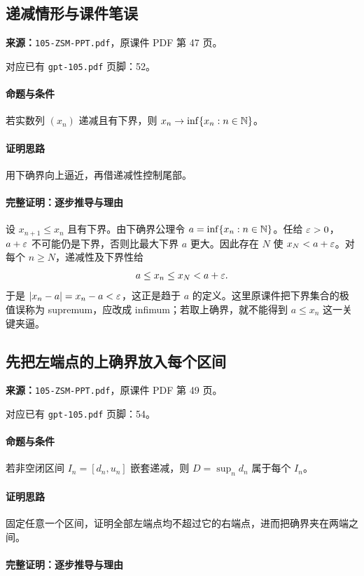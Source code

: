 \clearpage\subsection{递减情形与课件笔误}
\textbf{来源：}\texttt{105-ZSM-PPT.pdf}，原课件 PDF 第 47 页。\par
对应已有 \texttt{gpt-105.pdf} 页脚：52。\par
\paragraph{命题与条件}若实数列 $(x_n)$ 递减且有下界，则 $x_n\to\inf\{x_n:n\in\mathbb{N}\}$。
\paragraph{证明思路}用下确界向上逼近，再借递减性控制尾部。
\paragraph{完整证明：逐步推导与理由}

设 $x_{n+1}\le x_n$ 且有下界。由下确界公理令 $a=\inf\{x_n:n\in\mathbb{N}\}$。任给 $\varepsilon>0$，$a+\varepsilon$ 不可能仍是下界，否则比最大下界 $a$ 更大。因此存在 $N$ 使 $x_N<a+\varepsilon$。对每个 $n\ge N$，递减性及下界性给
\[a\le x_n\le x_N<a+\varepsilon.\]
于是 $|x_n-a|=x_n-a<\varepsilon$，这正是趋于 $a$ 的定义。这里原课件把下界集合的极值误称为 supremum，应改成 infimum；若取上确界，就不能得到 $a\le x_n$ 这一关键夹逼。

\clearpage\subsection{先把左端点的上确界放入每个区间}
\textbf{来源：}\texttt{105-ZSM-PPT.pdf}，原课件 PDF 第 49 页。\par
对应已有 \texttt{gpt-105.pdf} 页脚：54。\par
\paragraph{命题与条件}若非空闭区间 $I_n=[d_n,u_n]$ 嵌套递减，则 $D=\sup_n d_n$ 属于每个 $I_n$。
\paragraph{证明思路}固定任意一个区间，证明全部左端点均不超过它的右端点，进而把确界夹在两端之间。
\paragraph{完整证明：逐步推导与理由}

